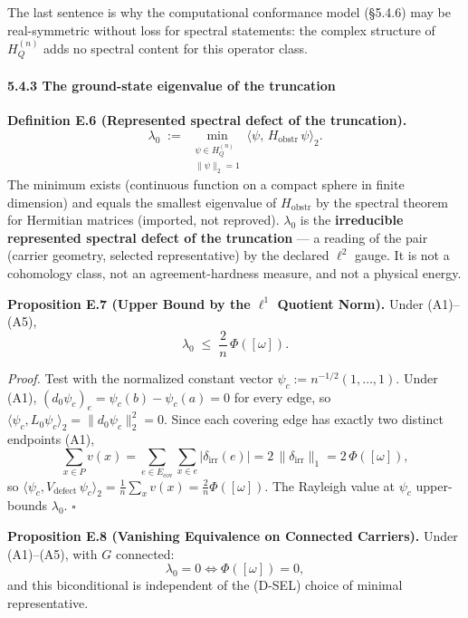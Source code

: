 \documentclass[
]{article}
\begin{document}
The last sentence is why the computational conformance model (§5.4.6) may be real-symmetric without loss for spectral statements: the complex structure of \(H_Q^{(n)}\) adds no spectral content for this operator class.

\paragraph{5.4.3 The ground-state eigenvalue of the truncation}\label{the-ground-state-eigenvalue-of-the-truncation}

\textbf{Definition E.6 (Represented spectral defect of the truncation).}
\[\lambda_0 \;:=\; \min_{\substack{\psi \in H_Q^{(n)} \\ \|\psi\|_2 = 1}} \langle \psi,\, H_{\mathrm{obstr}}\, \psi \rangle_2 .\]
The minimum exists (continuous function on a compact sphere in finite dimension) and equals the smallest eigenvalue of \(H_{\mathrm{obstr}}\) by the spectral theorem for Hermitian matrices (imported, not reproved). \(\lambda_0\) is the \textbf{irreducible represented spectral defect of the truncation} --- a reading of the pair (carrier geometry, selected representative) by the declared \(\ell^2\) gauge. It is not a cohomology class, not an agreement-hardness measure, and not a physical energy.

\textbf{Proposition E.7 (Upper Bound by the \(\ell^1\) Quotient Norm).} Under (A1)--(A5),
\[\lambda_0 \;\le\; \frac{2}{n}\, \Phi([\omega]) .\]

\emph{Proof.} Test with the normalized constant vector \(\psi_c := n^{-1/2}(1, \dots, 1)\). Under (A1), \((d_0 \psi_c)_e = \psi_c(b) - \psi_c(a) = 0\) for every edge, so \(\langle \psi_c, L_0 \psi_c \rangle_2 = \|d_0\psi_c\|_2^2 = 0\). Since each covering edge has exactly two distinct endpoints (A1),
\[\sum_{x \in P} v(x) = \sum_{e \in E_{\mathrm{cov}}} \sum_{x \in e} |\delta_{\mathrm{irr}}(e)| = 2\,\|\delta_{\mathrm{irr}}\|_1 = 2\,\Phi([\omega]),\]
so \(\langle \psi_c, V_{\mathrm{defect}}\, \psi_c \rangle_2 = \tfrac{1}{n} \sum_x v(x) = \tfrac{2}{n}\Phi([\omega])\). The Rayleigh value at \(\psi_c\) upper-bounds \(\lambda_0\). \(\square\)

\textbf{Proposition E.8 (Vanishing Equivalence on Connected Carriers).} Under (A1)--(A5), with \(G\) connected:
\[\lambda_0 = 0 \iff \Phi([\omega]) = 0 ,\]
and this biconditional is independent of the (D-SEL) choice of minimal representative.
\end{document}

